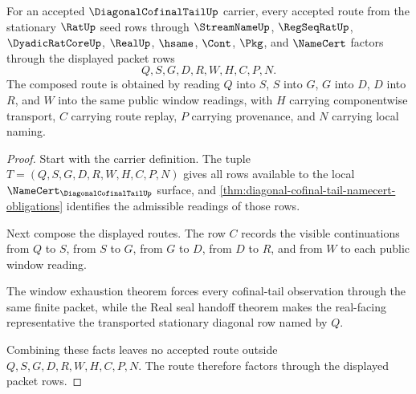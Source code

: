 \begin{theorem}
\label{thm:diagonal-cofinal-tail-route-composition}
For an accepted $\DiagonalCofinalTailUp$ carrier, every accepted route from the stationary $\RatUp$ seed rows through $\StreamNameUp$, $\RegSeqRatUp$, $\DyadicRatCoreUp$, $\RealUp$, $\hsame$, $\Cont$, $\Pkg$, and $\NameCert$ factors through the displayed packet rows
$$
Q,S,G,D,R,W,H,C,P,N.
$$
The composed route is obtained by reading $Q$ into $S$, $S$ into $G$, $G$ into $D$, $D$ into $R$, and $W$ into the same public window readings, with $H$ carrying componentwise transport, $C$ carrying route replay, $P$ carrying provenance, and $N$ carrying local naming.
\end{theorem}
\begin{proof}
Start with the carrier definition. The tuple $T=(Q,S,G,D,R,W,H,C,P,N)$ gives all rows available to the local $\NameCert_{\DiagonalCofinalTailUp}$ surface, and \autoref{thm:diagonal-cofinal-tail-namecert-obligations} identifies the admissible readings of those rows.

Next compose the displayed routes. The row $C$ records the visible continuations from $Q$ to $S$, from $S$ to $G$, from $G$ to $D$, from $D$ to $R$, and from $W$ to each public window reading.

The window exhaustion theorem forces every cofinal-tail observation through the same finite packet, while the Real seal handoff theorem makes the real-facing representative the transported stationary diagonal row named by $Q$.

Combining these facts leaves no accepted route outside $Q,S,G,D,R,W,H,C,P,N$. The route therefore factors through the displayed packet rows.
\end{proof}

